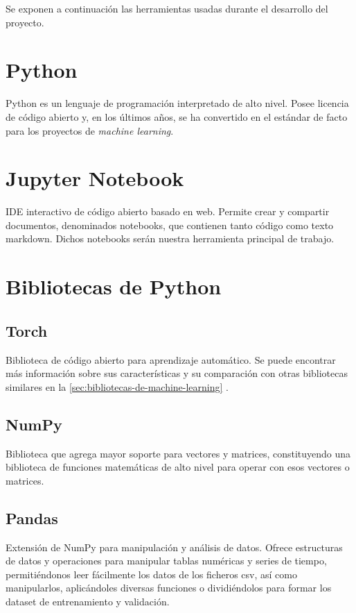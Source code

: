 
Se exponen a continuación las herramientas usadas durante el desarrollo del proyecto.

\section{Python}\label{sec:bibliotecas-de}
Python es un lenguaje de programación interpretado de alto nivel. Posee licencia de código abierto y, en los últimos años, se ha convertido en el estándar de facto para los proyectos de \textit{machine learning}.

\section{Jupyter Notebook}
IDE interactivo de código abierto basado en web. Permite crear y compartir documentos, denominados notebooks, que contienen tanto código como texto markdown. Dichos notebooks serán nuestra herramienta principal de trabajo. 

\section{Bibliotecas de Python}

\subsection{Torch}
Biblioteca de código abierto para aprendizaje automático. Se puede encontrar más información sobre sus características y su comparación con otras bibliotecas similares en la \autoref{sec:bibliotecas-de-machine-learning} .
 
\subsection{NumPy}
Biblioteca que agrega mayor soporte para vectores y matrices, constituyendo una biblioteca de funciones matemáticas de alto nivel para operar con esos vectores o matrices.

\subsection{Pandas}
Extensión de NumPy para manipulación y análisis de datos. Ofrece estructuras de datos y operaciones para manipular tablas numéricas y series de tiempo, permitiéndonos leer fácilmente los datos de los ficheros csv, así como manipularlos, aplicándoles diversas funciones o dividiéndolos para formar los dataset de entrenamiento y validación.

